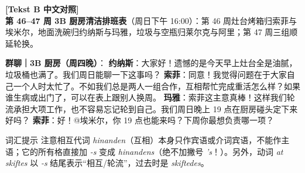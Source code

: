 \begin{transbox}
\small
\textbf{\color{NCDTeal}[Tekst B 中文对照]}\\
\textbf{第 46--47 周 3B 厨房清洁排班表}（周日下午 16:00）：第 46 周灶台烤箱归索菲与埃米尔，地面洗碗归约纳斯与玛雅，垃圾与空瓶归莱尔克与阿里；第 47 周三组顺延轮换。

\textbf{群聊｜3B 厨房（周四晚）}：
\textbf{约纳斯}：大家好！遗憾的是今天早上灶台全是油腻，垃圾桶也满了。我们周日能聊一下这事吗？
\textbf{索菲}：同意！我觉得问题在于大家自己一个人时太忙了。不如我们总是两人一组合作，互相帮忙完成重活怎么样？如果谁生病或出门了，可以在表上跟别人换周。
\textbf{玛雅}：索菲这主意真棒！这样我们轮流承担大项工作，也不容易忘记轮到自己。我们周日晚上 19 点在厨房碰头定下来好吗？
\textbf{索菲}：好！@埃米尔，你 19 点也能来吗？下周你最想负责哪一项？
\end{transbox}


\begin{tipbox}{词汇提示}
注意相互代词 \textit{hinanden}（互相）本身只作宾语或介词宾语，不能作主语；它的所有格直接加 \textit{-s} 变成 \textit{hinandens}（绝不加撇号 \textit{'s}！）。另外，动词 \textit{at skiftes} 以 \textit{-s} 结尾表示“相互/轮流”，过去时是 \textit{skiftedes}。
\end{tipbox}

